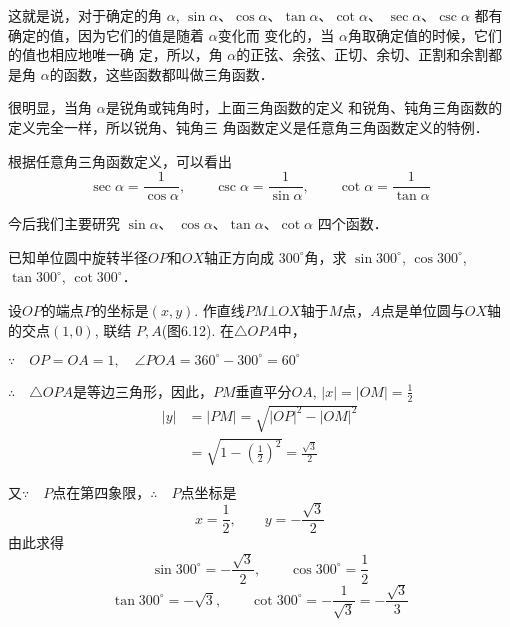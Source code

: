 这就是说，对于确定的角 $\alpha$, $\sin\alpha$、$\cos \alpha$、$\tan \alpha$、$\cot \alpha$、
$\sec\alpha$、$\csc\alpha$
都有确定的值，因为它们的值是随着 $\alpha$变化而
变化的，当 $\alpha$角取确定值的时候，它们的值也相应地唯一确
定，所以，角 $\alpha$的正弦、余弦、正切、余切、正割和余割都
是角 $\alpha$的函数，这些函数都叫做三角函数．

很明显，当角 $\alpha$是锐角或钝角时，上面三角函数的定义
和锐角、钝角三角函数的定义完全一样，所以锐角、钝角三
角函数定义是任意角三角函数定义的特例．

根据任意角三角函数定义，可以看出
\[\sec\alpha=\frac{1}{\cos\alpha},\qquad \csc \alpha=\frac{1}{\sin\alpha},\qquad \cot \alpha=\frac{1}{\tan\alpha}\]

今后我们主要研究
$\sin \alpha$、 $\cos \alpha$、$\tan \alpha$、$\cot \alpha$ 四个函数．

\begin{example}
    已知单位圆中旋转半径$OP$和$OX$轴正方向成
$300^{\circ}$角，求 $\sin300^{\circ}$, $\cos300^{\circ}$, $\tan 300^{\circ}$, $\cot300^{\circ}$．

\end{example}

\begin{solution}
    设$OP$的端点$P$的坐标是$(x,y)$. 作直线$PM\bot OX$轴于$M$点，$A$点是单位圆与$OX$轴的交点$(1,0)$, 联结
$P,A$(图6.12). 在$\triangle OPA$中，

$\because\quad OP=OA=1,\quad \angle POA=360^{\circ}-300^{\circ}=60^{\circ}$

$\therefore\quad \triangle OPA$是等边三角形，因此，$PM$垂直平分$OA$,
$|x|=|OM|=\frac{1}{2}$
\[\begin{split}
    |y|&=|PM|=\sqrt{|OP|^2-|OM|^2}\\
&=\sqrt{1-\left(\frac{1}{2}\right)^2}=\frac{\sqrt{3}}{2}
\end{split}\]

\begin{figure}[htp]
    \centering
{}
    \caption{}
\end{figure}

又$\because\quad P$点在第四象限，$\therefore\quad P$点坐标是
\[x=\frac{1}{2},\qquad y=-\frac{\sqrt{3}}{2}\]
由此求得
\[\sin300^{\circ}=-\frac{\sqrt{3}}{2},\qquad 
\cos300^{\circ}=\frac{1}{2}\]
\[
\tan300^{\circ}=-\sqrt{3},\qquad 
\cot300^{\circ}=-\frac{1}{\sqrt{3}}=-\frac{\sqrt{3}}{3}\]
\end{solution}


